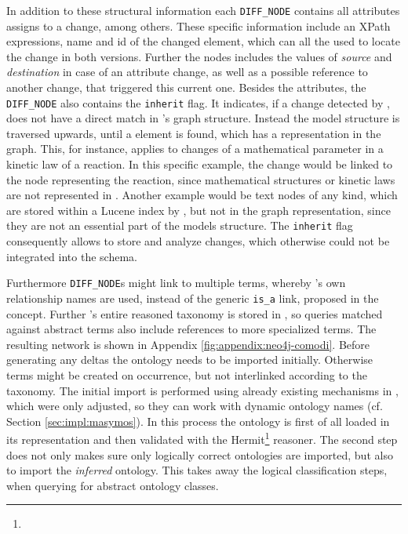 In addition to these structural information each \texttt{DIFF\_NODE} contains all attributes \bives assigns to a change, among others. These \bives specific information include an XPath expressions, name and id of the changed \xml element, which can all the used to locate the change in both versions.
Further the nodes includes the values of \emph{source} and \emph{destination} in case of an attribute change, as well as a possible reference to another change, that triggered this current one.
Besides the \bives attributes, the \texttt{DIFF\_NODE} also contains the \texttt{inherit} flag. It indicates, if a change detected by \bives, does not have a direct match in \masymos's graph structure. Instead the model structure is traversed  upwards, until a element is found, which has a representation in the \masymos graph.
This, for instance, applies to changes of a mathematical parameter in a kinetic law of a reaction. In this specific example, the change would be linked to the node representing the reaction, since mathematical structures or kinetic laws are not represented in \masymos. Another example would be text nodes of any kind, which are stored within a Lucene index by \masymos, but not in the graph representation, since they are not an essential part of the models structure.
The \texttt{inherit} flag consequently allows to store and analyze changes, which otherwise could not be integrated into the schema.

Furthermore \texttt{DIFF\_NODE}s might link to multiple \comodi terms, whereby \comodi's own relationship names are used, instead of the generic \texttt{is\_a} link, proposed in the concept.
Further \comodi's entire reasoned taxonomy is stored in \masymos, so queries matched against abstract terms also include references to more specialized terms. The resulting network is shown in Appendix \ref{fig:appendix:neo4j-comodi}.
Before generating any deltas the \comodi ontology needs to be imported initially. Otherwise terms might be created on occurrence, but not interlinked according to the taxonomy.
The initial import is performed using already existing mechanisms in \masymos, which were only adjusted, so they can work with dynamic ontology names (cf. Section \ref{sec:impl:masymos}). In this process the ontology is first of all loaded in its \owl representation and then validated with the Hermit\footnote{} reasoner. The second step does not only makes sure only logically correct ontologies are imported, but also to import the \emph{inferred} ontology. This takes away the logical classification steps, when querying for abstract ontology classes.

